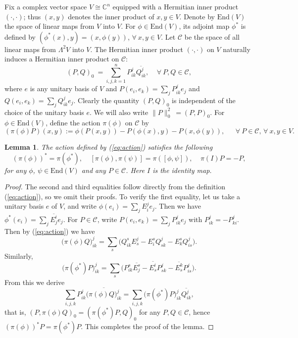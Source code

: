 \documentclass{amsart}
\newtheorem{lemma}{Lemma}
\begin{document}
Fix a complex vector space $V\cong {\mathbb C}^n$ equipped with a
Hermitian inner product $(\cdot,\cdot)$; thus $(x,y)$ denotes the inner
product of $x,y\in V$. Denote by $\mbox{End}(V)$ the space of linear maps from $V$ into $V$. For $\phi \in \mbox{End}(V)$, its adjoint map $\phi^{\ast}$ is defined by
$ (\phi^{\ast}(x), y) = (x, \phi (y))$, $\forall \ x,y\in V$.
Let ${\mathcal C}$ be the space of all linear maps from $\Lambda^2V$ into $V$.
The Hermitian inner product $(\cdot,\cdot)$ on $V$ naturally induces a
Hermitian inner product on ${\mathcal C}$:
$$ (P, Q)_0 \ = \sum_{i,j,k=1}^n\!P^j_{ik} \overline{Q^j_{ik}}, \ \ \ \ \ \forall \ P, Q\in {\mathcal C}, $$
where $e$ is any unitary basis of $V$ and $P(e_i,e_k)=\sum_jP^j_{ik}e_j$ and $Q(e_i,e_k)=\sum_jQ^j_{ik}e_j$.  Clearly the quantity $(P, Q)_0$ is independent of the choice of the unitary basis $e$. We will also write $\parallel \! P\!\parallel^2_0 \ = (P,P)_0$.
For $\phi \in \mbox{End}(V)$, define the action $\pi (\phi)$ on ${\mathcal C}$ by
\begin{equation} \label{eq:action}
(\pi (\phi)P)(x,y) := \phi (P(x,y)) - P(\phi (x), y) - P(x, \phi (y)), \ \ \ \ \ \ \ \forall\ P \in {\mathcal C}, \, \forall \ x,y \in V.
\end{equation}

\begin{lemma}
The action defined by (\ref{eq:action}) satisfies the following
\begin{equation}  \label{eq:action3}
  (\pi(\phi))^{\ast} = \pi (\phi^{\ast}), \ \ \ \ \ [\pi(\phi), \pi(\psi)]= \pi([\phi, \psi]),  \ \ \ \ \ \pi (I)P=-P,
\end{equation}
for any $\phi$, $\psi \in \mbox{End}(V)$ and any $P \in {\mathcal C}$. Here $I$ is the identity map.
\end{lemma}
\begin{proof}
The second and third equalities follow directly from the definition (\ref{eq:action}), so we omit their proofs. To verify the first equality, let us take a unitary basis $e$ of $V$, and write $\phi (e_i) = \sum_j E_i^{j}e_j$. Then we have $\phi^{\ast}(e_i) = \sum_j \overline{E^i_j} e_j$. For $P\in {\mathcal C}$, write $P(e_i,e_k)=\sum_jP^j_{ik}e_j$ with $P^j_{ik}=-P^j_{ki}$. Then by (\ref{eq:action}) we have
$$ \big(\pi (\phi)Q\big)_{ik}^j = \sum_s \big( Q^s_{ik}E^j_s - E^s_iQ^j_{sk} - E^s_k Q^j_{is} \big).  $$
Similarly,
$$ \big(\pi (\phi^{\ast})P\big)_{ik}^j = \sum_s \big( P^s_{ik}\overline{E^s_j} - \overline{E^i_s}P^j_{sk} - \overline{E^k_s} P^j_{is} \big).  $$
From this we derive
$$ \sum_{i,j,k} P^j_{ik} \overline{\big(\pi (\phi)Q\big)_{ik}^j} = \sum_{i,j,k} \big(\pi (\phi^{\ast})P\big)_{ik}^j \overline{Q^j_{ik}}, $$
that is, $(P, \pi(\phi)Q)_0 = (\pi(\phi^{\ast})P, Q)_0$ for any $P, Q\in {\mathcal C}$, hence $(\pi (\phi))^{\ast} P = \pi(\phi^{\ast})P$. This completes the proof of the lemma.
\end{proof}
\end{document}
